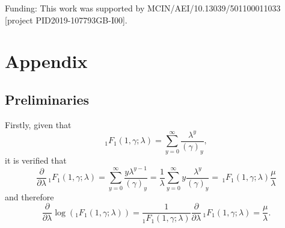 Funding: This work was supported by MCIN/AEI/10.13039/501100011033 [project PID2019-107793GB-I00].



\address{Antonio J. S\'{a}ez-Castillo \\
  University of Ja\'{e}n \\
  Statistics and Operations Research Department \\
  Spain \\
  }

\address{Antonio Conde-S\'{a}nchez \\
  University of Ja\'{e}n \\
  Statistics and Operations Research Department \\
  Spain \\
  }


\address{Francisco Mart\'{i}nez \\
  University of Ja\'{e}n \\
  Department of Computer Science, Andalusian Research Institute in Data Science and Computational Intelligence (DaSCI) \\
  Spain \\
  }

\section*{Appendix}
\subsection{Preliminaries}
Firstly, given that
\[
_{1}F_{1}\left(1, \gamma; \lambda \right) = \sum_{y = 0}^{\infty} \frac{\lambda^{y}}{\left(\gamma\right)_{y}},
\]
it is verified that
$$ \frac{\partial}{\partial \lambda} \, _{1}F_{1}\left(1, \gamma; \lambda \right) = \sum_{y=0}^{\infty} \frac{y \lambda^{y-1}}{\left(\gamma\right)_{y}} = \frac{1}{\lambda} \sum_{y=0}^{\infty} y \frac{\lambda^{y}}{\left(\gamma\right)_{y}} = \, _{1}F_{1}\left(1, \gamma; \lambda \right) \frac{\mu}{\lambda} $$
and therefore
\begin{equation}\label{der1f1lambda}
    \frac{\partial}{\partial \lambda} \log \left(_{1}F_{1}\left(1, \gamma; \lambda \right) \right) = \frac{1}{_{1}F_{1}\left(1, \gamma; \lambda \right)} \frac{\partial}{\partial \lambda} \, _{1}F_{1}\left(1, \gamma; \lambda \right) = \frac{\mu}{\lambda}.
\end{equation}

